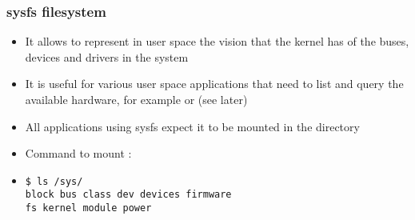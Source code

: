 \begin{frame}[fragile]
  \frametitle{sysfs filesystem}
  \begin{itemize}
  \item It allows to represent in user space the vision that the kernel
    has of the buses, devices and drivers in the system
  \item It is useful for various user space applications that need to
    list and query the available hardware, for example  or
     (see later)
  \item All applications using sysfs expect it to be mounted in the
     directory
  \item Command to mount :\\
  \item
\begin{verbatim}
$ ls /sys/
block bus class dev devices firmware
fs kernel module power
\end{verbatim}
  \end{itemize}
\end{frame}
